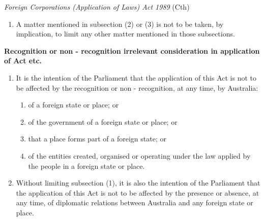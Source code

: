 \begin{statutedetails}{\textit{Foreign Corporations (Application of Laws) Act 1989} (Cth)}
\begin{enumerate}[label=(\arabic*)]
\begin{enumerate}[label=(\alph*)]
            \item the existence, nature or extent of any other interest in a foreign corporation; or
            \item the internal management and proceedings of a foreign corporation; or
            \item the validity of a foreign corporation's dealings otherwise than with outsiders;
        \end{enumerate}
        \item A matter mentioned in subsection (2) or (3) is not to be taken, by implication, to limit any other matter mentioned in those subsections.
    \end{enumerate}

    \textbf{Recognition or non - recognition irrelevant consideration in application of Act etc.}
    \begin{enumerate}[label=(\arabic*)]
        \item It is the intention of the Parliament that the application of this Act is not to be affected by the recognition or non - recognition, at any time, by Australia:
        \begin{enumerate}[label=(\alph*)]
            \item of a foreign state or place; or
            \item of the government of a foreign state or place; or
            \item that a place forms part of a foreign state; or
            \item of the entities created, organised or operating under the law applied by the people in a foreign state or place.           
        \end{enumerate}
        \item Without limiting subsection (1), it is also the intention of the Parliament that the application of this Act is not to be affected by the presence or absence, at any time, of diplomatic relations between Australia and any foreign state or place.
    \end{enumerate}
\end{statutedetails}

